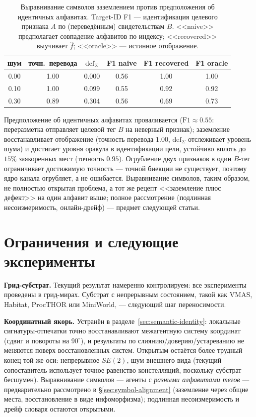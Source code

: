 \documentclass{article}
\begin{document}
\begin{table}[h]
\caption{Выравнивание символов заземлением против предположения об идентичных
алфавитах. Target-ID F1 --- идентификация целевого признака $A$ по
(переведённым) свидетельствам $B$. <<naive>> предполагает совпадение алфавитов
по индексу; <<recovered>> выучивает $\hat f$; <<oracle>> --- истинное
отображение.}
\label{tab:symbol-alignment}
\centering
\small
\begin{tabular}{c c c c c c}
\toprule
шум & точн.\ перевода & $\mathrm{def}_\Sigma$ & F1 naive & F1 recovered & F1 oracle \\
\midrule
0.00 & 1.00 & 0.000 & 0.56 & 1.00 & 1.00 \\
0.10 & 1.00 & 0.099 & 0.55 & 0.92 & 0.92 \\
0.30 & 0.89 & 0.304 & 0.56 & 0.69 & 0.73 \\
\bottomrule
\end{tabular}
\end{table}

Предположение об идентичных алфавитах проваливается
($\text{F1}\approx0.55$: переразметка отправляет целевой тег $B$ на неверный
признак); заземление восстанавливает отображение (точность перевода $1.00$,
$\mathrm{def}_\Sigma$ отслеживает уровень шума) и достигает уровня оракула в
идентификации цели, устойчиво вплоть до $15\%$ заякоренных мест (точность
$0.95$). Огрубление двух признаков в один $B$-тег ограничивает достижимую
точность --- точной биекции не существует, поэтому ядро канала огрубляет, а
не ошибается. Выравнивание символов, таким образом, не полностью открытая
проблема, а тот же рецепт <<заземление плюс дефект>> на один алфавит выше;
полное рассмотрение (подлинная несоизмеримость, онлайн-дрейф) --- предмет
следующей статьи.

\section{Ограничения и следующие эксперименты}
\label{sec:limitations}

\textbf{Грид-субстрат.} Текущий результат намеренно контролируем: все
эксперименты проведены в грид-мирах. Субстрат с непрерывным состоянием, такой
как VMAS, Habitat, ProcTHOR или MiniWorld, --- следующий шаг переносимости.

\textbf{Координатный якорь.} Устранён в
разделе~\ref{sec:semantic-identity}: локальные сигнатуры-отпечатки
точно восстанавливают межагентную систему координат (сдвиг и повороты
на $90^\circ$), и результаты по слиянию/доверию/устареванию не
меняются поверх восстановленных систем. Открытым остаётся более
трудный конец той же оси: непрерывное $SE(2)$, шум внешнего вида
(текущий сопоставитель использует точное равенство констелляций,
поскольку субстрат бесшумен). Выравнивание символов --- агенты с
\emph{разными алфавитами тегов} --- предварительно рассмотрено в
\S\ref{sec:symbol-alignment} (заземление через общие места,
восстановление в виде инфоморфизма); подлинная несоизмеримость и дрейф
словаря остаются открытыми.
\end{document}

